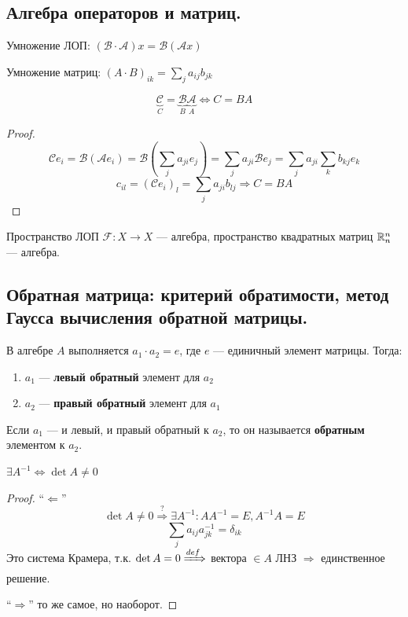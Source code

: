 \subsection{Алгебра операторов и матриц.}

Умножение ЛОП: $(\mathcal B \cdot \mathcal A)x = \mathcal B(\mathcal A x)$

Умножение матриц: $(A\cdot B)_{ik}=\sum\limits_{j} a_{ij}b_{jk}$

\begin{theorem}
    $$\underbrace{\mathcal C}_{C} = \underbrace{\mathcal B}_{B} \underbrace{\mathcal A}_{A} \Leftrightarrow C = BA$$
\end{theorem}
\begin{proof}
    $$\mathcal C e_i = \mathcal B(\mathcal A e_i) = \mathcal B\left(\sum_{j} a_{ji}e_j\right)=\sum_j a_{ji} \mathcal B e_j = \sum_j a_{ji} \sum_k b_{kj} e_k$$
    $$c_{il} = (\mathcal C e_i)_l = \sum_j a_{ji} b_{lj} \Rightarrow C = BA$$
\end{proof}

Пространство ЛОП $\mathcal F : X\to X$ --- алгебра, пространство квадратных матриц $\mathbb{R}_n^n$ --- алгебра.

\subsection{Обратная матрица: критерий обратимости, метод Гаусса вычисления обратной матрицы.}

В алгебре $A$ выполняется $a_1 \cdot a_2 = e$, где $e$ --- единичный элемент матрицы. Тогда:
\begin{enumerate}
    \item $a_1$ --- \textbf{левый обратный} элемент для $a_2$
    \item $a_2$ --- \textbf{правый обратный} элемент для $a_1$
\end{enumerate}

Если $a_1$ --- и левый, и правый обратный к $a_2$, то он называется \textbf{обратным} элементом к $a_2$.

\label{inversability}
\begin{theorem}
    $\exists A^{−1} \Leftrightarrow \det A \not= 0$
\end{theorem}
\begin{proof}
    ``$\Leftarrow$''
    $$\det A\not=0 \stackrel{?}{\Rightarrow} \exists A^{-1} : AA^{-1}=E, A^{-1}A=E$$
    $$\sum_j a_{ij}a^{-1}_{jk}=\delta_{ik}$$
    Это система Крамера, т.к. $\det A = 0 \xRightarrow{def}$ вектора $\in A$ ЛНЗ $\Rightarrow$ единственное решение.

    ``$\Rightarrow$'' то же самое, но наоборот. \yoba
\end{proof}

